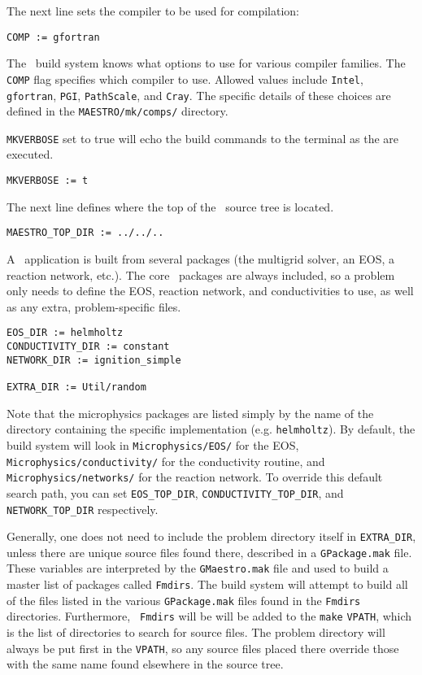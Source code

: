 The next line sets the compiler to be used for compilation:
\begin{lstlisting}[language={[gnu]make},mathescape=false]
  COMP := gfortran
\end{lstlisting}
The \maestro\ build system knows what options to use for various
compiler families.  The {\tt COMP} flag specifies which compiler to
use.  Allowed values include {\tt Intel}, {\tt gfortran}, {\tt PGI},
{\tt PathScale}, and {\tt Cray}.  The specific details of these
choices are defined in the {\tt MAESTRO/mk/comps/} directory.

{\tt MKVERBOSE} set to true will echo the build commands to the
terminal as the are executed.
\begin{lstlisting}[language={[gnu]make},mathescape=false]
  MKVERBOSE := t
\end{lstlisting}

The next line defines where the top of the \maestro\ source tree is located.
\begin{lstlisting}[language={[gnu]make},mathescape=false]
  MAESTRO_TOP_DIR := ../../..
\end{lstlisting}

A \maestro\ application is built from several packages (the
multigrid solver, an EOS, a reaction network, etc.).  The core
\maestro\ packages are always included, so a problem only needs
to define the EOS, reaction network, and conductivities to
use, as well as any extra, problem-specific files.  
\begin{lstlisting}[language={[gnu]make},mathescape=false]
EOS_DIR := helmholtz   
CONDUCTIVITY_DIR := constant
NETWORK_DIR := ignition_simple

EXTRA_DIR := Util/random
\end{lstlisting}
Note that the microphysics packages are listed simply by the name of 
the directory containing the specific implementation (e.g. {\tt helmholtz}).
By default, the build system will look in {\tt Microphysics/EOS/} for
the EOS, {\tt Microphysics/conductivity/} for the conductivity routine,
and {\tt Microphysics/networks/} for the reaction network.  To
override this default search path, you can set {\tt EOS\_TOP\_DIR},
{\tt CONDUCTIVITY\_TOP\_DIR}, and {\tt NETWORK\_TOP\_DIR} respectively.

Generally, one does not need to include the problem directory itself
in {\tt EXTRA\_DIR}, unless there are unique source files found there,
described in a {\tt GPackage.mak} file.  These variables are
interpreted by the {\tt GMaestro.mak} file and used to build a master
list of packages called {\tt Fmdirs}.  The build system will attempt
to build all of the files listed in the various {\tt GPackage.mak}
files found in the {\tt Fmdirs} directories.  Furthermore, {\tt
  Fmdirs} will be will be added to the {\tt make} {\tt VPATH}, which
is the list of directories to search for source files.  The problem
directory will always be put first in the {\tt VPATH}, so any source
files placed there override those with the same name found elsewhere
in the source tree.  

